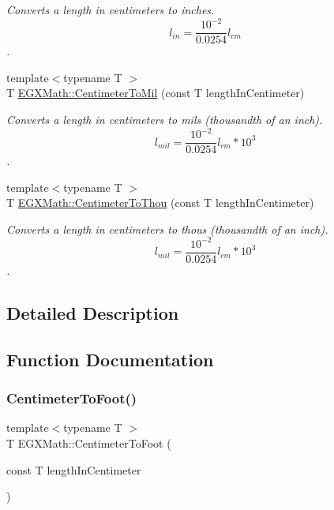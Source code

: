 \begin{DoxyCompactItemize}
\begin{DoxyCompactList}\small\item\em Converts a length in centimeters to inches. \[ l_{in}= \frac{10^{-2}}{0.0254} l_{cm} \]. \end{DoxyCompactList}\item 
{\footnotesize template$<$typename T $>$ }\\T \mbox{\hyperlink{group___e_g_x_math-_conversions-_length_conversions-_s_i-_centimeter-_imperial_ga4d32adb63d2c5ac44ce1f7a0ba746452}{E\+G\+X\+Math\+::\+Centimeter\+To\+Mil}} (const T length\+In\+Centimeter)
\begin{DoxyCompactList}\small\item\em Converts a length in centimeters to mils (thousandth of an inch). \[ l_{mil}= \frac{10^{-2}}{0.0254} l_{cm} * 10^{3} \]. \end{DoxyCompactList}\item 
{\footnotesize template$<$typename T $>$ }\\T \mbox{\hyperlink{group___e_g_x_math-_conversions-_length_conversions-_s_i-_centimeter-_imperial_ga06aee91cfbc90db20c6a085129dbf4fa}{E\+G\+X\+Math\+::\+Centimeter\+To\+Thou}} (const T length\+In\+Centimeter)
\begin{DoxyCompactList}\small\item\em Converts a length in centimeters to thous (thousandth of an inch). \[ l_{mil}= \frac{10^{-2}}{0.0254} l_{cm} * 10^{3} \]. \end{DoxyCompactList}\end{DoxyCompactItemize}


\subsection{Detailed Description}


\subsection{Function Documentation}
\mbox{\label{group___e_g_x_math-_conversions-_length_conversions-_s_i-_centimeter-_imperial_ga27bbb3b1cf61bac428f40d6804e9aaec}} 
\subsubsection{\texorpdfstring{Centimeter\+To\+Foot()}{CentimeterToFoot()}}
{\footnotesize\ttfamily template$<$typename T $>$ \\
T E\+G\+X\+Math\+::\+Centimeter\+To\+Foot (\begin{DoxyParamCaption}\item[{const T}]{length\+In\+Centimeter }\end{DoxyParamCaption})}



